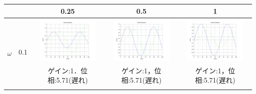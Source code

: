 \documentclass[a4paper,11pt]{jsarticle}
\begin{document}
\begin{enumerate}
\begin{table}[H]
\begin{tabular}{|c|c|c|c|c|}
             &

             &
            0.25
             &
            0.5
             &
            1
            \\ \hline

            \multirow{6}{*}{$\omega$}
             &
            \multirow{2}{*}{0.1}
             &
            \begin{minipage}{45mm}
              \centering
              \includegraphics[width=3cm,clip]{picture/1.png}
            \end{minipage}
             &
            \begin{minipage}{45mm}
              \centering
              \includegraphics[width=3cm,clip]{picture/4.png}
            \end{minipage}
             &
            \begin{minipage}{45mm}
              \centering
              \includegraphics[width=3cm,clip]{picture/7.png}
            \end{minipage}
            \\ \cline{3-5}


             &

             &
            ゲイン:1．位相:5.71(遅れ)
             &
            ゲイン:1，位相:5.71(遅れ)
             &
            ゲイン:1，位相:5.71(遅れ)
            \\\cline{2-5}



\end{tabular}
\end{table}
\end{enumerate}
\end{document}
